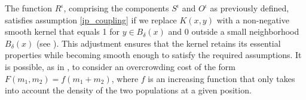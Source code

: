 \documentclass[smallextended,referee,envcountsect,]{svjour3}
\begin{document}
\begin{remark}
The function $R^\iota$, comprising the components $S^\iota$ and $O^\iota$ as previously defined, satisfies assumption \eqref{ip_coupling} if we replace $K(x,y)$ with a non-negative smooth kernel that equals 1 for $y \in B_\delta(x)$ and 0 outside a small neighborhood $B_\delta(x)$ (see \cite{abc}). This adjustment ensures that the kernel retains its essential properties while becoming smooth enough to satisfy the required assumptions.
It is possible, as in \cite{barilla}, to consider an overcrowding cost of the form $F(m_1, m_2) = f(m_1 + m_2)$, where $f$ is an increasing function that only takes into account the density of the two populations at a given position. 


 

 
\end{remark}
\end{document}
